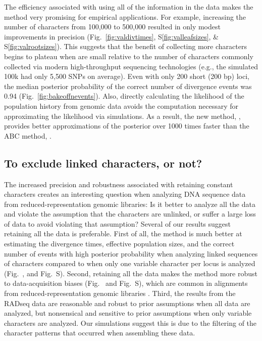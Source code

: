 The efficiency associated with using all of the information in the data makes
the method very promising for empirical applications.
For example, increasing the number of characters from 100,000 to 500,000
resulted in only modest improvements in precision
(Fig.\ 
\ref{fig:valdivtimes}, S\ref{fig:valleafsizes}, \& S\ref{fig:valrootsizes}).
This suggests that the benefit of collecting more characters begins to plateau
when \datasets are small relative to the number of characters commonly
collected via modern high-throughput sequencing technologies (e.g., the
simulated 100k \datasets had only 5,500 SNPs on average).
Even with only 200 short (200 bp) loci, the median posterior probability
of the correct number of divergence events was 0.94
(Fig.~\ref{fig:bakeoffnevents}).
Also, directly calculating the likelihood of the population history from
genomic data avoids the computation necessary for approximating the likelihood
via simulations.
As a result, the new method, \ecoevolity, provides better approximations of the
posterior over 1000 times faster than the ABC method, \dppmsbayes.


\subsection{To exclude linked characters, or not?}

The increased precision and robustness associated with retaining constant
characters creates an interesting question when analyzing DNA sequence data
from reduced-representation genomic libraries:
Is it better to analyze all the data and violate the assumption that the
characters are unlinked, or suffer a large loss of data to avoid violating that
assumption?
Several of our results suggest retaining all the data is preferable.
First of all, the method is much better at estimating the divergence times,
effective population sizes, and the correct number of events with high
posterior probability when analyzing linked sequences of characters compared to
when only one variable character per locus is analyzed
(Fig.\ 
,
and
Fig.\ 
S).
Second, retaining all the data makes the method more robust to data-acquisition
biases
(Fig.\ 
\labelcref{fig:filtereddivtimes,fig:filterednevents}
and
Fig.\ 
S),
which are common in alignments from reduced-representation genomic
libraries
\citep{Harvey2015,Linck2017}.
Third, the results from the  RADseq data are
reasonable and robust to prior assumptions when all data are analyzed,
but nonsensical and sensitive to prior assumptions when only variable
characters are analyzed.
Our simulations suggest this is due to the filtering of the character patterns
that occurred when assembling these data.

